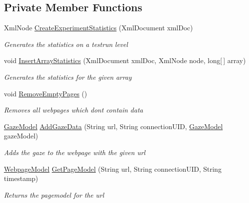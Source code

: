 \subsection*{Private Member Functions}
\begin{DoxyCompactItemize}
\item 
Xml\+Node \hyperlink{class_web_analyzer_1_1_models_1_1_data_model_1_1_test_model_aeb5429731ec41e1460952faf568e10be}{Create\+Experiment\+Statistics} (Xml\+Document xml\+Doc)
\begin{DoxyCompactList}\small\item\em Generates the statistics on a testrun level \end{DoxyCompactList}\item 
void \hyperlink{class_web_analyzer_1_1_models_1_1_data_model_1_1_test_model_a285dda9a94c63de7c47203f47e69e372}{Insert\+Array\+Statistics} (Xml\+Document xml\+Doc, Xml\+Node node, long\mbox{[}$\,$\mbox{]} array)
\begin{DoxyCompactList}\small\item\em Generates the statistics for the given array \end{DoxyCompactList}\item 
void \hyperlink{class_web_analyzer_1_1_models_1_1_data_model_1_1_test_model_a2fd8bf35c47c7fe3aee6537a1514ce10}{Remove\+Empty\+Pages} ()
\begin{DoxyCompactList}\small\item\em Removes all webpages which don\textquotesingle{}t contain data \end{DoxyCompactList}\item 
\hyperlink{class_web_analyzer_1_1_models_1_1_data_model_1_1_gaze_model}{Gaze\+Model} \hyperlink{class_web_analyzer_1_1_models_1_1_data_model_1_1_test_model_ad58dc0c0e38b5663113167469c248796}{Add\+Gaze\+Data} (String url, String connection\+U\+I\+D, \hyperlink{class_web_analyzer_1_1_models_1_1_data_model_1_1_gaze_model}{Gaze\+Model} gaze\+Model)
\begin{DoxyCompactList}\small\item\em Adds the gaze to the webpage with the given url \end{DoxyCompactList}\item 
\hyperlink{class_web_analyzer_1_1_models_1_1_data_model_1_1_webpage_model}{Webpage\+Model} \hyperlink{class_web_analyzer_1_1_models_1_1_data_model_1_1_test_model_a25af5415274c9119748a92459dac10da}{Get\+Page\+Model} (String url, String connection\+U\+I\+D, String timestamp)
\begin{DoxyCompactList}\small\item\em Returns the pagemodel for the url \end{DoxyCompactList}\end{DoxyCompactItemize}
